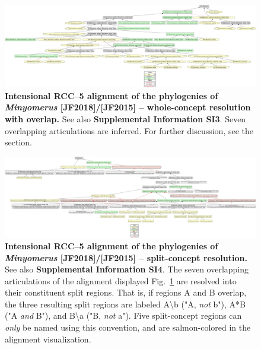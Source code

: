 \documentclass[fleqn,10pt,lineno]{wlpeerj} %
\begin{document}
\begin{figure}[h]
	\centering
	\includegraphics[width=\textwidth]{figure33.png}
	\caption{\textbf{Intensional RCC--5 alignment of the phylogenies of \textit{Minyomerus} [JF2018]/[JF2015] -- whole-concept resolution with overlap.} See also \textbf{Supplemental Information SI3}. Seven overlapping articulations are inferred. For further discussion, see the \textbf{} section.}
	\label{fig:align2}
\end{figure}

\begin{figure}[h]
	\centering
	\includegraphics[width=\textwidth]{figure34.png}
	\caption{\textbf{Intensional RCC--5 alignment of the phylogenies of \textit{Minyomerus} [JF2018]/[JF2015] -- split-concept resolution.} See also \textbf{Supplemental Information SI4}. The seven overlapping articulations of the alignment displayed Fig.~\ref{fig:align2} are resolved into their constituent split regions. That is, if regions A and B overlap, the three resulting split regions are labeled A\textbackslash b ("A, \emph{not} b"), A*B ("A \emph{and} B"), and B\textbackslash a ("B, \emph{not} a"). Five split-concept regions can \emph{only} be named using this convention, and are salmon-colored in the alignment visualization.}
	\label{fig:align3}
\end{figure}
\end{document}
